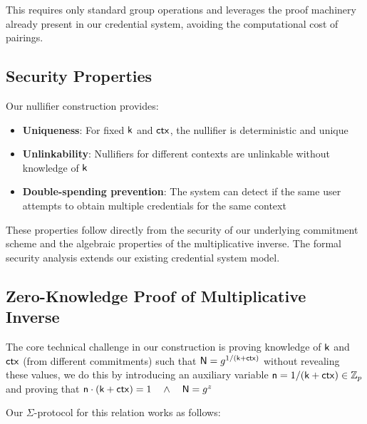 This requires only standard group operations and leverages the proof machinery already present in our credential system, avoiding the computational cost of pairings.




\subsection{Security Properties}
Our nullifier construction provides:

\begin{itemize}
    \item \textbf{Uniqueness}: For fixed $\mathsf{k}$ and $\mathsf{ctx}$, the nullifier is deterministic and unique
    \item \textbf{Unlinkability}: Nullifiers for different contexts are unlinkable without knowledge of $\mathsf{k}$
    \item \textbf{Double-spending prevention}: The system can detect if the same user attempts to obtain multiple credentials for the same context
\end{itemize}

These properties follow directly from the security of our underlying commitment scheme and the algebraic properties of the multiplicative inverse. The formal security analysis extends our existing credential system model.



\subsection{Zero-Knowledge Proof of Multiplicative Inverse}
The core technical challenge in our construction is proving knowledge of $\mathsf{k}$ and $\mathsf{ctx}$ (from different commitments) such that $\mathsf{N} = g^{1/(\mathsf{k} + \mathsf{ctx})}$ without revealing these values, we do this by introducing an auxiliary variable $\mathsf{n} = 1/(\mathsf{k} + \mathsf{ctx}) \in \mathbb{Z}_p$ and proving that $\mathsf{n} \cdot (\mathsf{k} + \mathsf{ctx}) = 1 \quad \wedge \quad \mathsf{N} = g^z$

Our $\Sigma$-protocol for this relation works as follows:

